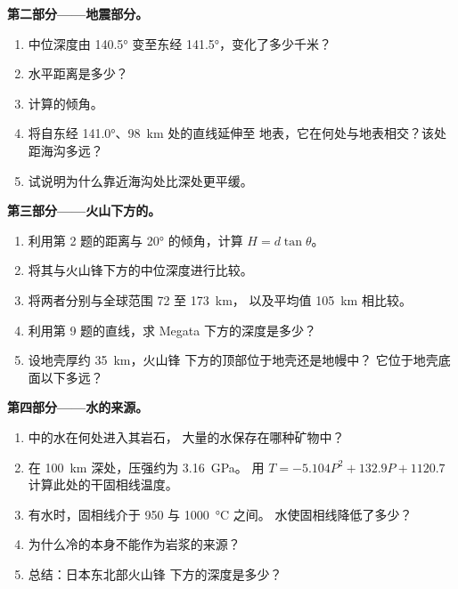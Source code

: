 \begin{problem}
\medskip
\noindent\textbf{第二部分——地震部分。}
\begin{enumerate}[resume]
  \item 中位深度由
        \ang{140.5} 变至东经 \ang{141.5}，变化了多少千米？
  \item 水平距离是多少？
  \item 计算的倾角。
  \item 将自东经 \ang{141.0}、\qty{98}{km} 处的直线延伸至
        地表，它在何处与地表相交？该处距海沟多远？
  \item 试说明为什么靠近海沟处比深处更平缓。
\end{enumerate}

\medskip
\noindent\textbf{第三部分——火山下方的。}
\begin{enumerate}[resume]
  \item 利用第 2 题的距离与
        \ang{20} 的倾角，计算 $H = d\tan\theta$。
  \item 将其与火山锋下方的中位深度进行比较。
  \item 将两者分别与全球范围 72 至 \qty{173}{km}，
        以及平均值 \qty{105}{km} 相比较。
  \item 利用第 9 题的直线，求 Megata 下方的深度是多少？
  \item 设地壳厚约 \qty{35}{km}，火山锋
        下方的顶部位于地壳还是地幔中？
        它位于地壳底面以下多远？
\end{enumerate}

\medskip
\noindent\textbf{第四部分——水的来源。}
\begin{enumerate}[resume]
  \item {}中的水在何处进入其岩石，
        大量的水保存在哪种矿物中？
  \item 在 \qty{100}{km} 深处，压强约为 \qty{3.16}{GPa}。
        用 $T = -5.104P^2 + 132.9P + 1120.7$ 计算此处的干固相线温度。
  \item 有水时，固相线介于 950 与 \qty{1000}{\celsius} 之间。
        水使固相线降低了多少？
  \item 为什么冷的本身不能作为岩浆的来源？
  \item 总结：日本东北部火山锋
        下方的深度是多少？
\end{enumerate}
\end{problem}
